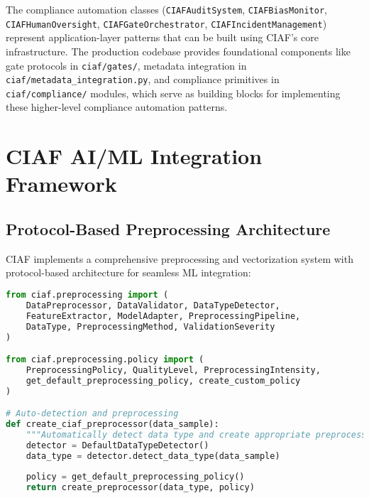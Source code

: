 \documentclass[12pt,a4paper]{article}
\begin{document}
\begin{tcolorbox}[colframe=blue!70, colback=green!8, title={\textbf{Implementation Note}}]
The compliance automation classes (\texttt{CIAFAuditSystem}, \texttt{CIAFBiasMonitor}, \texttt{CIAFHumanOversight}, \texttt{CIAFGateOrchestrator}, \texttt{CIAFIncidentManagement}) represent application-layer patterns that can be built using CIAF's core infrastructure. The production codebase provides foundational components like gate protocols in \texttt{ciaf/gates/}, metadata integration in \texttt{ciaf/metadata\_integration.py}, and compliance primitives in \texttt{ciaf/compliance/} modules, which serve as building blocks for implementing these higher-level compliance automation patterns.
\end{tcolorbox}

\section{CIAF AI/ML Integration Framework}

\subsection{Protocol-Based Preprocessing Architecture}

CIAF implements a comprehensive preprocessing and vectorization system with protocol-based architecture for seamless ML integration:

\begin{lstlisting}[language=Python, caption=Preprocessing Protocol Architecture]
from ciaf.preprocessing import (
    DataPreprocessor, DataValidator, DataTypeDetector,
    FeatureExtractor, ModelAdapter, PreprocessingPipeline,
    DataType, PreprocessingMethod, ValidationSeverity
)

from ciaf.preprocessing.policy import (
    PreprocessingPolicy, QualityLevel, PreprocessingIntensity,
    get_default_preprocessing_policy, create_custom_policy
)

# Auto-detection and preprocessing
def create_ciaf_preprocessor(data_sample):
    """Automatically detect data type and create appropriate preprocessor."""
    detector = DefaultDataTypeDetector()
    data_type = detector.detect_data_type(data_sample)
    
    policy = get_default_preprocessing_policy()
    return create_preprocessor(data_type, policy)
\end{lstlisting}
\end{document}
